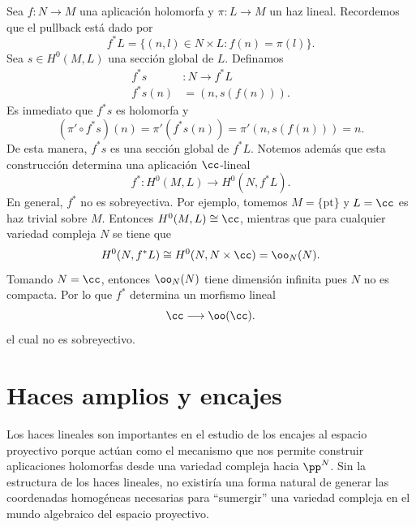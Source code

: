 	\begin{example}\label{seccionespullback}
		Sea $f:N\to M$ una aplicación holomorfa y $\pi:L\to M$ un haz lineal. Recordemos que el pullback está dado por
		\begin{equation*}
			f^*L=\{(n,l)\in N\times L:f(n)=\pi(l)\}.
		\end{equation*}
		Sea $s\in H^0(M,L)$ una sección global de $L$. Definamos
		\begin{align*}
			f^*s&:N\longrightarrow f^*L\\
			f^*s(n)&=(n,s(f(n))).
		\end{align*}	
		Es inmediato que $f^*s$ es holomorfa y 
		\begin{equation*}
			(\pi'\circ f^*s)(n)=\pi'(f^*s(n))=\pi'(n,s(f(n)))=n.
		\end{equation*}
		De esta manera, $f^*s$ es una sección global de $f^*L$. Notemos además que esta construcción determina una aplicación $\cc$-lineal
		\begin{equation*}
			f^*:H^0(M,L)\longrightarrow H^0(N,f^*L).
		\end{equation*}
		En general, $f^*$ no es sobreyectiva. Por ejemplo, tomemos $M=\{\mathrm{pt}\}$ y $L=\cc$ es haz trivial sobre $M$. Entonces $H^0(M,L)\cong\cc$, mientras que para cualquier variedad compleja $N$ se tiene que
		\begin{equation*}
			H^0(N,f^*L)\cong H^0(N,N\times \cc)=\oo_N(N).
		\end{equation*} 
		Tomando $N=\cc$, entonces $\oo_N(N)$ tiene dimensión infinita pues $N$ no es compacta. Por lo que $f^*$ determina un morfismo lineal
		\begin{equation*}
			\cc\longrightarrow \oo(\cc).
		\end{equation*}
		el cual no es sobreyectivo.
	\end{example}
	
\section{Haces amplios y encajes}

Los haces lineales son importantes en el estudio de los encajes al espacio proyectivo porque actúan como el mecanismo que nos permite construir aplicaciones holomorfas desde una variedad compleja hacia $\pp^N$. Sin la estructura de los haces lineales, no existiría una forma natural de generar las coordenadas homogéneas necesarias para \enquote{sumergir} una variedad compleja en el mundo algebraico del espacio proyectivo. 

